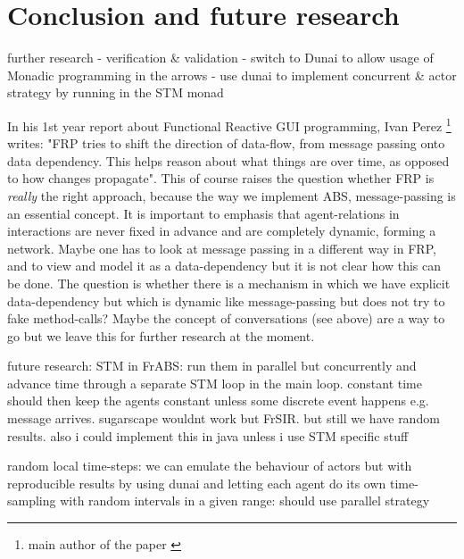 \section{Conclusion and future research}

further research
	- verification \& validation
	- switch to Dunai to allow usage of Monadic programming in the arrows
	- use dunai to implement concurrent \& actor strategy by running in the STM monad
	
In his 1st year report about Functional Reactive GUI programming, Ivan Perez \footnote{main author of the paper \cite{perez_functional_2016}} writes: "FRP tries to shift the direction of data-flow, from message passing onto data dependency. This helps reason about what things are over time, as opposed to how changes propagate". This of course raises the question whether FRP is \textit{really} the right approach, because the way we implement ABS, message-passing is an essential concept. It is important to emphasis that agent-relations in interactions are never fixed in advance and are completely dynamic, forming a network. Maybe one has to look at message passing in a different way in FRP, and to view and model it as a data-dependency but it is not clear how this can be done. The question is whether there is a mechanism in which we have explicit data-dependency but which is dynamic like message-passing but does not try to fake method-calls? Maybe the concept of conversations (see above) are a way to go but we leave this for further research at the moment.


future research: STM in FrABS: run them in parallel but concurrently and advance time through a separate STM loop in the main loop. constant time should then keep the agents constant unless some discrete event happens e.g. message arrives. sugarscape wouldnt work but FrSIR. but still we have random results. also i could implement this in java unless i use STM specific stuff

random local time-steps: we can emulate the behaviour of actors but with reproducible results by using dunai and letting each agent do its own time-sampling with random intervals in a given range: should use parallel strategy